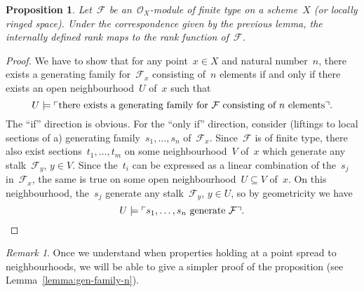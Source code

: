 \documentclass[10pt]{amsart}
\theoremstyle{definition}
\theoremstyle{plain}
\newtheorem{prop}[defn]{Proposition}
\theoremstyle{remark}
\newtheorem{rem}[defn]{Remark}
\newcommand{\F}{\mathcal{F}}
\renewcommand{\O}{\mathcal{O}}
\newcommand{\?}{\,{:}\,}
\renewcommand{\_}{\mathpunct{.}\,}
\newcommand{\speak}[1]{\ulcorner\text{\textnormal{#1}}\urcorner}
\begin{document}
\begin{prop}\label{prop:rank-function-internally}
Let~$\F$ be an~$\O_X$-module of finite type on a scheme~$X$ (or locally ringed
space). Under the correspondence given by the previous lemma, the internally
defined rank maps to the rank function of~$\F$.
\end{prop}
\begin{proof}
We have to show that for any point~$x \in X$ and natural number~$n$, there
exists a generating family for~$\F_x$ consisting of~$n$
elements if and only if there exists an open neighbourhood~$U$ of~$x$ such that
\[ U \models \speak{there exists a generating family
for~$\F$ consisting of~$n$ elements}. \]
The ``if'' direction is obvious. For the ``only if'' direction, consider
(liftings to local sections of a)
generating family~$s_1,\ldots,s_n$ of~$\F_x$. Since~$\F$ is of finite type,
there also exist sections~$t_1,\ldots,t_m$ on some neighbourhood~$V$ of~$x$ which
generate any stalk~$\F_y$, $y \in V$. Since the~$t_i$ can be expressed as a
linear combination of the~$s_j$ in~$\F_x$, the same is true on some open
neighbourhood~$U \subseteq V$ of~$x$. On this neighbourhood, the~$s_j$ generate
any stalk~$\F_y$, $y \in U$, so by geometricity we have
\[ U \models \speak{$s_1,\ldots,s_n$ generate~$\F$}. \qedhere \]
\end{proof}
\begin{rem}Once we understand when properties holding at a point spread to
neighbourhoods, we will be able to give a simpler proof of the proposition (see
Lemma~\ref{lemma:gen-family-n}).\end{rem}
\end{document}
